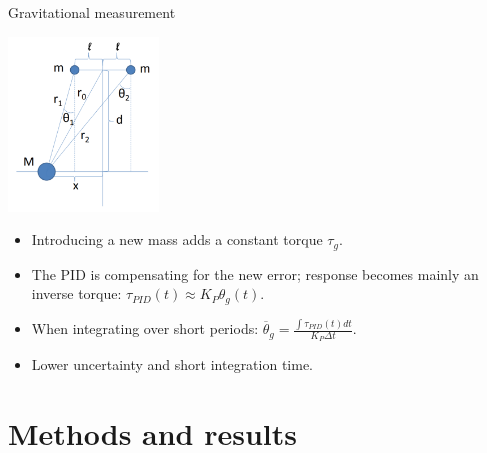 \documentclass{beamer}
\begin{document}
\begin{frame}{\hypertarget{frame:Gravimetric measurement}{Gravitational measurement}}
	\begin{center}		
		\includegraphics[width=0.3\textwidth,keepaspectratio]{Cavendish apparatus.PNG}
    \end{center}
	\begin{itemize}
		
		\item Introducing a new mass adds a constant torque $\tau_g$. 
		\item The PID is compensating for the new error; response becomes mainly an inverse torque: $\tau_{PID}(t) \approx K_P\theta_g(t)$. 
		\item When integrating over short periods: $\overline{\theta}_g =  \frac{\int \tau_{PID}(t) dt}{ K_P \Delta t} $. 	
		\item Lower uncertainty and short integration time.
	\end{itemize}
\end{frame}

\section{Methods and results}
\end{document}
